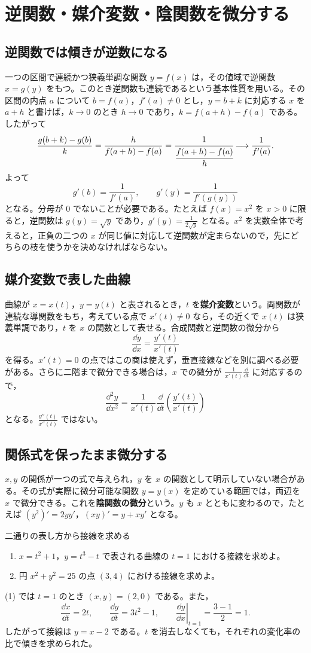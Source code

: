 \section{逆関数・媒介変数・陰関数を微分する}\label{節:逆媒介陰微分}
\subsection{逆関数では傾きが逆数になる}
一つの区間で連続かつ狭義単調な関数 $y=f(x)$ は，その値域で逆関数 $x=g(y)$ をもつ。このとき逆関数も連続であるという基本性質を用いる。その区間の内点 $a$ について $b=f(a)$，$f'(a)\ne0$ とし，$y=b+k$ に対応する $x$ を $a+h$ と書けば，$k\to0$ のとき $h\to0$ であり，$k=f(a+h)-f(a)$ である。したがって
\[
 \frac{g(b+k)-g(b)}k
 =\frac{h}{f(a+h)-f(a)}
 =\cfrac{1}{\cfrac{f(a+h)-f(a)}h}
 \longrightarrow\frac1{f'(a)}.
\]
よって
\[
 g'(b)=\frac1{f'(a)},\qquad
 g'(y)=\frac1{f'(g(y))}
\]
となる。分母が $0$ でないことが必要である。たとえば $f(x)=x^2$ を $x>0$ に限ると，逆関数は $g(y)=\sqrt y$ であり，$g'(y)=\frac1{2\sqrt y}$ となる。$x^2$ を実数全体で考えると，正負の二つの $x$ が同じ値に対応して逆関数が定まらないので，先にどちらの枝を使うかを決めなければならない。

\subsection{媒介変数で表した曲線}
曲線が $x=x(t)$，$y=y(t)$ と表されるとき，$t$ を\textbf{媒介変数}という。両関数が連続な導関数をもち，考えている点で $x'(t)\ne0$ なら，その近くで $x(t)$ は狭義単調であり，$t$ を $x$ の関数として表せる。合成関数と逆関数の微分から
\[
 \frac{\dd y}{\dd x}
 =\frac{y'(t)}{x'(t)}
\]
を得る。$x'(t)=0$ の点ではこの商は使えず，垂直接線などを別に調べる必要がある。さらに二階まで微分できる場合は，$x$ での微分が $\frac1{x'(t)}\frac{\dd}{\dd t}$ に対応するので，
\[
 \frac{\dd^2y}{\dd x^2}
 =\frac1{x'(t)}\frac{\dd}{\dd t}
   \left(\frac{y'(t)}{x'(t)}\right)
\]
となる。$\frac{y''(t)}{x''(t)}$ ではない。

\subsection{関係式を保ったまま微分する}
$x,y$ の関係が一つの式で与えられ，$y$ を $x$ の関数として明示していない場合がある。その式が実際に微分可能な関数 $y=y(x)$ を定めている範囲では，両辺を $x$ で微分できる。これを\textbf{陰関数の微分}という。$y$ も $x$ とともに変わるので，たとえば $(y^2)'=2yy'$，$(xy)'=y+xy'$ となる。

\begin{example}{二通りの表し方から接線を求める}
\begin{enumerate}[label=(\arabic*),leftmargin=*]
 \item $x=t^2+1$，$y=t^3-t$ で表される曲線の $t=1$ における接線を求めよ。
 \item 円 $x^2+y^2=25$ の点 $(3,4)$ における接線を求めよ。
\end{enumerate}
\end{example}
(1) では $t=1$ のとき $(x,y)=(2,0)$ である。また，
\[
 \frac{\dd x}{\dd t}=2t,\qquad
 \frac{\dd y}{\dd t}=3t^2-1,\qquad
 \left.\frac{\dd y}{\dd x}\right|_{t=1}
 =\frac{3-1}{2}=1.
\]
したがって接線は $y=x-2$ である。$t$ を消去しなくても，それぞれの変化率の比で傾きを求められた。

